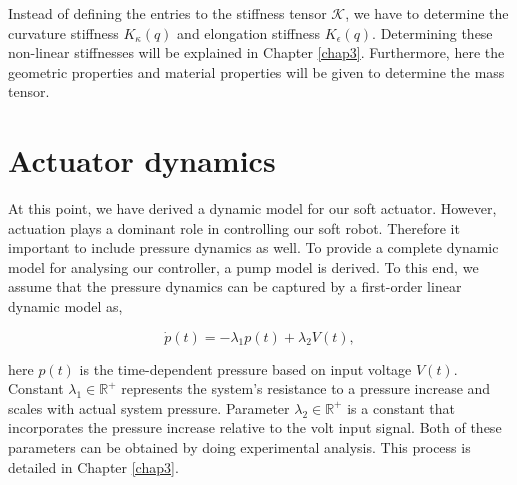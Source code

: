 Instead of defining the entries to the stiffness tensor $\mathcal{K}$, we have to determine the curvature stiffness $K_\kappa(q)$ and elongation stiffness $K_\epsilon(q)$. Determining these non-linear stiffnesses will be explained in Chapter \ref{chap3}. Furthermore, here the geometric properties and material properties will be given to determine the mass tensor. 




\section{Actuator dynamics}

At this point, we have derived a dynamic model for our soft actuator. However, actuation plays a dominant role in controlling our soft robot. Therefore it important to include pressure dynamics as well. To provide a complete dynamic model for analysing our controller, a pump model is derived. To this end, we assume that the pressure dynamics can be captured by a first-order linear dynamic model as,

\begin{equation}
    \dot{p}(t) = -\lambda_1 p(t) + \lambda_2 V(t),
\end{equation}

here $p(t)$ is the time-dependent pressure based on input voltage $V(t)$. Constant $\lambda_1 \in \mathbb{R}^+$ represents the system's resistance to a pressure increase and scales with actual system pressure. Parameter $\lambda_2 \in \mathbb{R}^+$ is a constant that incorporates the pressure increase relative to the volt input signal. Both of these parameters can be obtained by doing experimental analysis. This process is detailed in Chapter \ref{chap3}.






